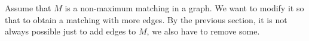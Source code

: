 

\setcounter{section}{4}
\setcounter{subsection}{2}
\setcounter{dfn}{2}

Assume that $M$ is a non-maximum matching in a graph.
We want to modify it so that to obtain a matching with more edges.
By the previous section, it is not always possible just to add edges to $M$, we also have to remove some.



